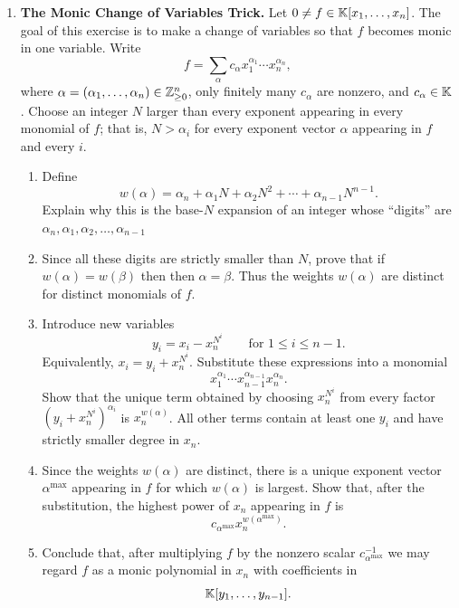 \documentclass[12pt,reqno]{amsart}
\begin{document}
\begin{enumerate}[leftmargin=*, resume=problems]

\item \textbf{The Monic Change of Variables Trick.} Let $0\neq f\in \mathbb{K}[x_1,\ldots,x_n]$. The goal of this exercise is to make a change of variables so that $f$ becomes monic in one variable. Write
\[
f=\sum_{\alpha} c_{\alpha}x_1^{\alpha_1}\cdots x_n^{\alpha_n},
\]
where $\alpha=(\alpha_1,\ldots,\alpha_n)\in \mathbb{Z}_{\geq 0}^n$, only finitely many $c_\alpha$ are nonzero, and $c_\alpha\in \mathbb{K}$. Choose an integer $N$ larger than every exponent appearing in every monomial of $f$; that is, $N>\alpha_i$ for every exponent vector $\alpha$ appearing in $f$ and every $i$.

\begin{enumerate}
    \item Define
    \[
    w(\alpha)
    =
    \alpha_n+\alpha_1N+\alpha_2N^2+\cdots+\alpha_{n-1}N^{n-1}.
    \]
    Explain why this is the base-$N$ expansion of an integer whose ``digits'' are $\alpha_n,\alpha_1,\alpha_2,\ldots,\alpha_{n-1}$

\item Since all these digits are strictly smaller than $N$, prove that if $w(\alpha)=w(\beta)$ then then $\alpha=\beta$. Thus the weights $w(\alpha)$ are distinct for distinct monomials of $f$.

    \item Introduce new variables
    \[
    y_i=x_i-x_n^{N^i}
    \qquad\text{for }1\leq i\leq n-1.
    \]
    Equivalently, $ x_i=y_i+x_n^{N^i}$. Substitute these expressions into a monomial
    \[
    x_1^{\alpha_1}\cdots x_{n-1}^{\alpha_{n-1}}x_n^{\alpha_n}.
    \]
    Show that the unique term obtained by choosing $x_n^{N^i}$ from every factor $(y_i+x_n^{N^i})^{\alpha_i}$ is $x_n^{w(\alpha)}$. All other terms contain at least one $y_i$ and have strictly smaller degree in $x_n$.

    \item Since the weights $w(\alpha)$ are distinct, there is a unique exponent vector $\alpha^{\max}$ appearing in $f$ for which $w(\alpha)$ is largest. Show that, after the substitution, the highest power of $x_n$ appearing in $f$ is
    \[
    c_{\alpha^{\max}}x_n^{w(\alpha^{\max})}.
    \]

    \item Conclude that, after multiplying $f$ by the nonzero scalar $c_{\alpha^{\max}}^{-1}$ we may regard $f$ as a monic polynomial in $x_n$ with coefficients in
    \[
    \mathbb{K}[y_1,\ldots,y_{n-1}].
    \]


\end{enumerate}
\end{enumerate}
\end{document}
